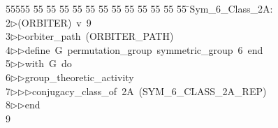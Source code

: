 %
%
\begin{tabbing}
55555 \= 55 \= 55 \= 55 \= 55 \= 55 \= 55 \= 55 \= 55 \= 55 \= 55 \= 55 \= 55 \= \>Sym\_6\_Class\_2A:\\[0pt]
2\>$\triangleright$\>(ORBITER)\ v\ 9\ \\[0pt]
3\>$\triangleright$\>$\triangleright$\>orbiter\_path\ (ORBITER\_PATH)\ \\[0pt]
4\>$\triangleright$\>$\triangleright$\>define\ G\ permutation\_group\ symmetric\_group\ 6\ end\ \\[0pt]
5\>$\triangleright$\>$\triangleright$\>with\ G\ do\ \\[0pt]
6\>$\triangleright$\>$\triangleright$\>group\_theoretic\_activity\ \\[0pt]
7\>$\triangleright$\>$\triangleright$\>$\triangleright$\>conjugacy\_class\_of\ 2A\ (SYM\_6\_CLASS\_2A\_REP)\ \\[0pt]
8\>$\triangleright$\>$\triangleright$\>end\\[0pt]
9\>\end{tabbing}
